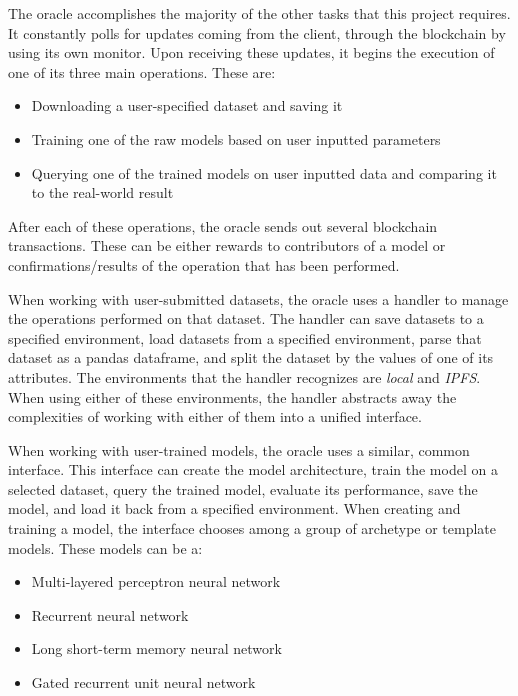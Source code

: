 \documentclass{article}
\begin{document}
    The oracle accomplishes the majority of the other tasks that this project requires.  It constantly polls for updates
    coming from the client, through the blockchain by using its own monitor.  Upon receiving these updates, it begins
    the execution of one of its three main operations.  These are:

    \begin{itemize}
        \item Downloading a user-specified dataset and saving it
        \item Training one of the raw models based on user inputted parameters
        \item Querying one of the trained models on user inputted data and comparing it to the real-world result
    \end{itemize}

    After each of these operations, the oracle sends out several blockchain transactions.  These can be either
    rewards to contributors of a model or confirmations/results of the operation that has been performed.

    When working with user-submitted datasets, the oracle uses a handler to manage the operations performed on that dataset.
    The handler can save datasets to a specified environment, load datasets from a specified environment, parse that dataset
    as a pandas dataframe, and split the dataset by the values of one of its attributes.  The environments that the handler
    recognizes are \textit{local} and \textit{IPFS}.  When using either of these environments, the handler abstracts away the
    complexities of working with either of them into a unified interface.

    When working with user-trained models, the oracle uses a similar, common interface.  This interface can create the model
    architecture, train the model on a selected dataset, query the trained model, evaluate its performance, save the model,
    and load it back from a specified environment.  When creating and training a model, the interface chooses among a group
    of archetype or template models.  These models can be a:

    \begin{itemize}
        \item Multi-layered perceptron neural network
        \item Recurrent neural network
        \item Long short-term memory neural network
        \item Gated recurrent unit neural network
    \end{itemize}
\end{document}
